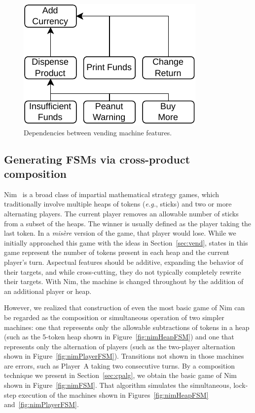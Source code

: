 \documentclass[sigplan,anonymous,review]{acmart}
\begin{document}
\begin{figure}
    \centering
    \includegraphics[width=0.55\linewidth]{figures/VendingMachine.pdf}
    \caption{Dependencies between vending machine features.}
    \label{fig:vmDependencies}
\end{figure}

\subsection{Generating FSMs via cross-product composition}\label{sec:nim}

Nim~\cite{enwiki:1102668015} is a broad class of impartial mathematical strategy games, which traditionally involve multiple heaps of tokens (\emph{e.g.}, sticks) and two or more alternating players. The current player removes an allowable number of sticks from a subset of the heaps. The winner is usually defined as the player taking the last token. In a \emph{mis\`{e}re} version of the game, that player would lose.
While we initially approached this game with the ideas in Section~\ref{sec:vend}, states in this game represent the number of tokens present in each heap and the current player's turn.  Aspectual features should be additive, expanding the behavior of their targets, and while cross-cutting, they do not typically completely rewrite their targets.  With Nim, the machine is changed throughout by the addition of an additional player or heap.   

However, we realized that construction of even the most basic game of Nim can be regarded as the composition or simultaneous operation of two simpler machines:   one that represents only the allowable subtractions of tokens in a heap (such as the 5-token heap shown in Figure~\ref{fig:nimHeapFSM}) and one that represents only the alternation of players (such as the two-player alternation shown in Figure~\ref{fig:nimPlayerFSM}).  Transitions not shown in those machines are errors, such as Player~A taking two consecutive turns.   By a composition technique we present in Section~\ref{sec:cpalg}, we obtain the basic game of Nim shown in Figure~\ref{fig:nimFSM}.  That algorithm simulates the simultaneous, lock-step execution of the machines shown in Figures~\ref{fig:nimHeapFSM} and~\ref{fig:nimPlayerFSM}.
\end{document}
